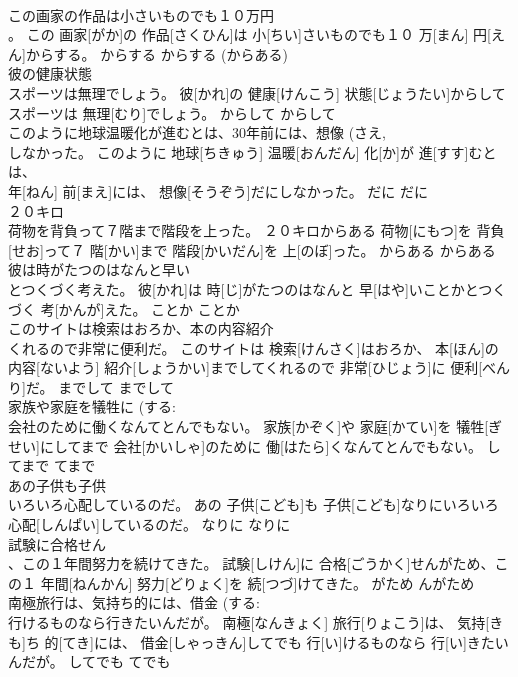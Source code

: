 \documentclass[8pt]{extreport}
\begin{document}
\begin{CJK}{UTF8}{min}
\\	この画家の作品は小さいものでも１０万円 
\\	。	この 画家[がか]の 作品[さくひん]は 小[ちい]さいものでも１０ 万[まん] 円[えん]からする。	からする	からする (からある)	
\\	彼の健康状態 
\\	スポーツは無理でしょう。	彼[かれ]の 健康[けんこう] 状態[じょうたい]からしてスポーツは 無理[むり]でしょう。	からして	からして	
\\	このように地球温暖化が進むとは、30年前には、想像 (さえ, 
\\	しなかった。	このように 地球[ちきゅう] 温暖[おんだん] 化[か]が 進[すす]むとは、 
\\	年[ねん] 前[まえ]には、 想像[そうぞう]だにしなかった。	だに	だに	
\\	２０キロ 
\\	荷物を背負って７階まで階段を上った。	２０キロからある 荷物[にもつ]を 背負[せお]って７ 階[かい]まで 階段[かいだん]を 上[のぼ]った。	からある	からある	
\\	彼は時がたつのはなんと早い 
\\	とつくづく考えた。	彼[かれ]は 時[じ]がたつのはなんと 早[はや]いことかとつくづく 考[かんが]えた。	ことか	ことか	
\\	このサイトは検索はおろか、本の内容紹介 
\\	くれるので非常に便利だ。	このサイトは 検索[けんさく]はおろか、 本[ほん]の 内容[ないよう] 紹介[しょうかい]までしてくれるので 非常[ひじょう]に 便利[べんり]だ。	までして	までして	
\\	家族や家庭を犠牲に (する: 
\\	会社のために働くなんてとんでもない。	家族[かぞく]や 家庭[かてい]を 犠牲[ぎせい]にしてまで 会社[かいしゃ]のために 働[はたら]くなんてとんでもない。	してまで	てまで	
\\	あの子供も子供 
\\	いろいろ心配しているのだ。	あの 子供[こども]も 子供[こども]なりにいろいろ 心配[しんぱい]しているのだ。	なりに	なりに	
\\	試験に合格せん 
\\	、この１年間努力を続けてきた。	試験[しけん]に 合格[ごうかく]せんがため、この１ 年間[ねんかん] 努力[どりょく]を 続[つづ]けてきた。	がため	んがため	
\\	南極旅行は、気持ち的には、借金 (する: 
\\	行けるものなら行きたいんだが。	南極[なんきょく] 旅行[りょこう]は、 気持[きも]ち 的[てき]には、 借金[しゃっきん]してでも 行[い]けるものなら 行[い]きたいんだが。	してでも	てでも	

\end{CJK}
\end{document}
